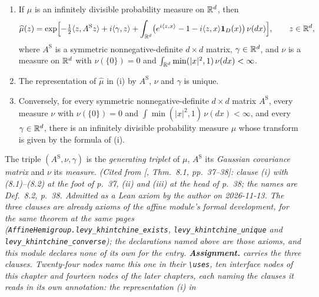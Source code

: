 \begin{theorem}
\label{thm:cited-A39}
\leanok
\begin{enumerate}
\item[(i)] If $\mu$ is an infinitely divisible probability measure on $\mathbb{R}^d$, then
\[
  \widehat\mu(z) = \exp\Bigl[-\tfrac12\langle z, A^{\mathrm S}z\rangle + i\langle\gamma, z\rangle
  + \int_{\mathbb{R}^d}\bigl(e^{i\langle z, x\rangle} - 1 - i\langle z, x\rangle\mathbf{1}_D(x)\bigr)\,
  \nu(dx)\Bigr], \qquad z \in \mathbb{R}^d,
\]
where $A^{\mathrm S}$ is a symmetric nonnegative-definite $d \times d$ matrix, $\gamma \in \mathbb{R}^d$, and $\nu$
is a measure on $\mathbb{R}^d$ with $\nu(\{0\}) = 0$ and $\int_{\mathbb{R}^d}\min(|x|^2, 1)\,\nu(dx) < \infty$.
\item[(ii)] The representation of $\widehat\mu$ in (i) by $A^{\mathrm S}$, $\nu$ and $\gamma$ is unique.
\item[(iii)] Conversely, for every symmetric nonnegative-definite $d \times d$ matrix $A^{\mathrm S}$, every
measure $\nu$ with $\nu(\{0\}) = 0$ and $\int\min(|x|^2, 1)\,\nu(dx) < \infty$, and every
$\gamma \in \mathbb{R}^d$, there is an infinitely divisible probability measure $\mu$ whose transform is
given by the formula of (i).
\end{enumerate}
The triple $(A^{\mathrm S}, \nu, \gamma)$ is the \emph{generating triplet} of $\mu$, $A^{\mathrm S}$ its
\emph{Gaussian covariance matrix} and $\nu$ its \emph{\Levy{} measure}.
\statusA\quad{}\quad\emph{(Cited from [, Thm.~8.1, pp.~37--38]:
clause (i) with (8.1)--(8.2) at the foot of p.~37, (ii) and (iii) at the head of p.~38; the names
are Def.~8.2, p.~38. Admitted as a Lean axiom by the author on 2026-11-13. The three clauses are
already axioms of the affine module's formal development, for the same theorem at the same pages
(\texttt{AffineHemigroup.levy\_khintchine\_exists}, \texttt{levy\_khintchine\_unique} and
\texttt{levy\_khintchine\_converse}); the declarations named above are those axioms, and this
module declares none of its own for the entry.
\textbf{Assignment.}  carries the three clauses. Twenty-four nodes name this one in
their \texttt{\textbackslash uses}, ten interface nodes of this chapter and fourteen nodes of the
later chapters, each naming the clauses it reads in its own annotation: the representation (i) in
}
\end{theorem}
